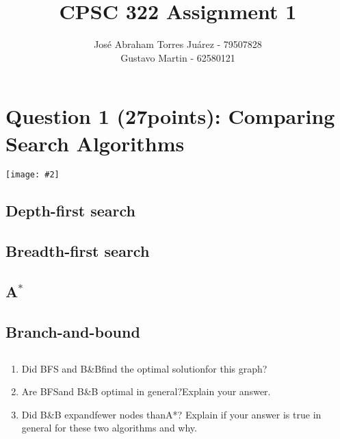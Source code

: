 \documentclass{article}
\newcommand{\centerfig}[2]{\begin{center}\texttt{[image: \#2]}\end{center}}
\begin{document}
\title{CPSC 322 Assignment 1}
\author{
    José Abraham Torres Juárez - 79507828 \\
    Gustavo Martin - 62580121
}
\date{}
\maketitle
\vspace{-2em}


\section{Question 1 (27points): Comparing Search Algorithms}
\centerfig{1}{../figs/1_graph}

\subsection{Depth-first search}

\subsection{Breadth-first search}

\subsection{A$^*$}

\subsection{Branch-and-bound}

\subsection{}

\begin{enumerate}[label=(\alph*)]
    \item Did BFS and B\&Bfind the optimal solutionfor this graph?
    \item Are BFSand B\&B optimal in general?Explain your answer. 
    \item Did B\&B expandfewer nodes thanA*? Explain if your answer is true in general for these two algorithms and why.
\end{enumerate}

\end{document}
